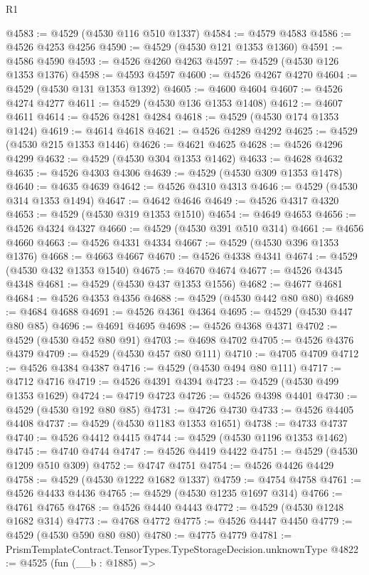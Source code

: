 \begin{lexlean}{R1}
\begin{coremodule}
@4583 := @4529 (@4530 @116 @510 @1337)
@4584 := @4579 @4583
@4586 := @4526 @4253 @4256
@4590 := @4529 (@4530 @121 @1353 @1360)
@4591 := @4586 @4590
@4593 := @4526 @4260 @4263
@4597 := @4529 (@4530 @126 @1353 @1376)
@4598 := @4593 @4597
@4600 := @4526 @4267 @4270
@4604 := @4529 (@4530 @131 @1353 @1392)
@4605 := @4600 @4604
@4607 := @4526 @4274 @4277
@4611 := @4529 (@4530 @136 @1353 @1408)
@4612 := @4607 @4611
@4614 := @4526 @4281 @4284
@4618 := @4529 (@4530 @174 @1353 @1424)
@4619 := @4614 @4618
@4621 := @4526 @4289 @4292
@4625 := @4529 (@4530 @215 @1353 @1446)
@4626 := @4621 @4625
@4628 := @4526 @4296 @4299
@4632 := @4529 (@4530 @304 @1353 @1462)
@4633 := @4628 @4632
@4635 := @4526 @4303 @4306
@4639 := @4529 (@4530 @309 @1353 @1478)
@4640 := @4635 @4639
@4642 := @4526 @4310 @4313
@4646 := @4529 (@4530 @314 @1353 @1494)
@4647 := @4642 @4646
@4649 := @4526 @4317 @4320
@4653 := @4529 (@4530 @319 @1353 @1510)
@4654 := @4649 @4653
@4656 := @4526 @4324 @4327
@4660 := @4529 (@4530 @391 @510 @314)
@4661 := @4656 @4660
@4663 := @4526 @4331 @4334
@4667 := @4529 (@4530 @396 @1353 @1376)
@4668 := @4663 @4667
@4670 := @4526 @4338 @4341
@4674 := @4529 (@4530 @432 @1353 @1540)
@4675 := @4670 @4674
@4677 := @4526 @4345 @4348
@4681 := @4529 (@4530 @437 @1353 @1556)
@4682 := @4677 @4681
@4684 := @4526 @4353 @4356
@4688 := @4529 (@4530 @442 @80 @80)
@4689 := @4684 @4688
@4691 := @4526 @4361 @4364
@4695 := @4529 (@4530 @447 @80 @85)
@4696 := @4691 @4695
@4698 := @4526 @4368 @4371
@4702 := @4529 (@4530 @452 @80 @91)
@4703 := @4698 @4702
@4705 := @4526 @4376 @4379
@4709 := @4529 (@4530 @457 @80 @111)
@4710 := @4705 @4709
@4712 := @4526 @4384 @4387
@4716 := @4529 (@4530 @494 @80 @111)
@4717 := @4712 @4716
@4719 := @4526 @4391 @4394
@4723 := @4529 (@4530 @499 @1353 @1629)
@4724 := @4719 @4723
@4726 := @4526 @4398 @4401
@4730 := @4529 (@4530 @192 @80 @85)
@4731 := @4726 @4730
@4733 := @4526 @4405 @4408
@4737 := @4529 (@4530 @1183 @1353 @1651)
@4738 := @4733 @4737
@4740 := @4526 @4412 @4415
@4744 := @4529 (@4530 @1196 @1353 @1462)
@4745 := @4740 @4744
@4747 := @4526 @4419 @4422
@4751 := @4529 (@4530 @1209 @510 @309)
@4752 := @4747 @4751
@4754 := @4526 @4426 @4429
@4758 := @4529 (@4530 @1222 @1682 @1337)
@4759 := @4754 @4758
@4761 := @4526 @4433 @4436
@4765 := @4529 (@4530 @1235 @1697 @314)
@4766 := @4761 @4765
@4768 := @4526 @4440 @4443
@4772 := @4529 (@4530 @1248 @1682 @314)
@4773 := @4768 @4772
@4775 := @4526 @4447 @4450
@4779 := @4529 (@4530 @590 @80 @80)
@4780 := @4775 @4779
@4781 := PrismTemplateContract.TensorTypes.TypeStorageDecision.unknownType
@4822 := @4525
    (fun (__b : @1885) =>

\end{coremodule}
\end{lexlean}
